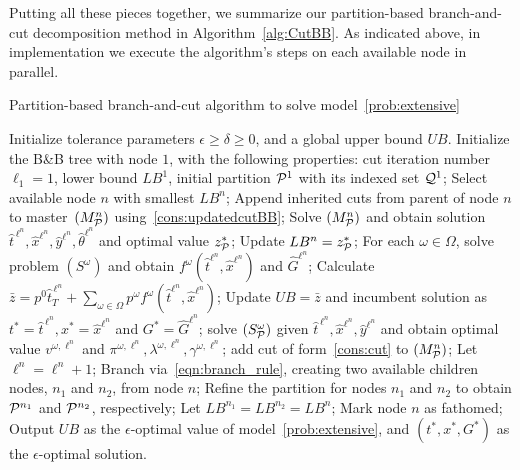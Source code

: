 \documentclass[11pt]{article}
\newcommand{\cQ}{{\cal Q}}
\newcommand{\cP}{{\cal P}}
\begin{document}
	\newline
	Putting all these pieces together, we summarize our partition-based branch-and-cut decomposition method in Algorithm~\ref{alg:CutBB}. As indicated above, in implementation we execute the algorithm's steps on each available node in parallel.
	\begin{algorithm}[ht]
		\caption{Partition-based branch-and-cut algorithm to solve model~\eqref{prob:extensive}}
		\label{alg:CutBB}
		\begin{algorithmic}[1]
			\State Initialize tolerance parameters \(\epsilon \geq \delta \geq 0\), and a global upper bound \(UB\). 
			\State Initialize the B\&B tree with node \(1\), with the following properties: cut iteration number \(\ell_1 = 1\), lower bound \(LB^1\), initial partition \(\cP^1\) with its indexed set \(\cQ^1\);
			\State Select available node \(n\) with smallest \(LB^n\);
			\State Append inherited cuts from parent of node \(n\) to master~\((M^n_{\cP})\) using~\eqref{cons:updatedcutBB};
			\Repeat
			\State Solve \((M^n_{\cP})\) and obtain solution \(\hat{t}^{\, \ell^n}, \hat{x}^{\ell^n}, \hat{y}^{\ell^n}, \hat{\theta}^{\ell^n}\) and optimal value \(z_{\cP}^*\);
			\If{\(z_{\cP}^* > LB^n\)}
			\State Update \(LB^n = z_{\cP}^*\);
			\EndIf
			\State For each \(\omega \in \Omega\), solve problem \((S^\omega)\) and obtain \(f^{\omega}(\hat{t}^{\ell^n},\hat{x}^{\ell^n})\) and \(\hat{G}^{\ell^n}\);
			\State Calculate \(\bar{z} = p^0 \hat{t}^{\, \ell^n}_T + \sum_{\omega \in \Omega} p^\omega f^{\omega}(\hat{t}^{\ell^n},\hat{x}^{\ell^n})\);
			\State Update \(UB = \bar{z}\) and incumbent solution as \(t^* = \hat{t}^{\, \ell^n}, x^* = \hat{x}^{\ell^n}\) and \(G^* = \hat{G}^{\ell^n}\);
			\EndIf
			\State solve \((S_{\cP}^\omega)\) given \(\hat{t}^{\, \ell^n}, \hat{x}^{\ell^n}, \hat{y}^{\ell^n}\) and obtain optimal value \(v^{\omega,\ell^n}\) and \(\pi^{\omega,\ell^n}, \lambda^{\omega,\ell^n}, \gamma^{\omega,\ell^n}\); \label{alg:bbCutLBSub}
			add cut of form~\eqref{cons:cut} to \((M^n_{\cP})\);
			\EndIf
			\EndFor
			\State Let \(\ell^n = \ell^n + 1\);
			\State Branch via~\eqref{eqn:branch_rule}, creating two available children nodes, \(n_1\) and \(n_2\), from node \(n\);
			\State Refine the partition for nodes \(n_1\) and \(n_2\) to obtain \(\cP^{n_1}\) and \(\cP^{n_2}\), respectively;
			\State Let \(LB^{n_1} = LB^{n_2} = LB^n\);
			\EndIf
			\State Mark node \(n\) as fathomed;
			\vspace{0.1cm}
			\State Output \(UB\) as the $\epsilon$-optimal value of model~\eqref{prob:extensive}, and \((t^*, x^*, G^*)\) as the \(\epsilon\)-optimal solution.
		\end{algorithmic}
	\end{algorithm}
	
\end{document}
